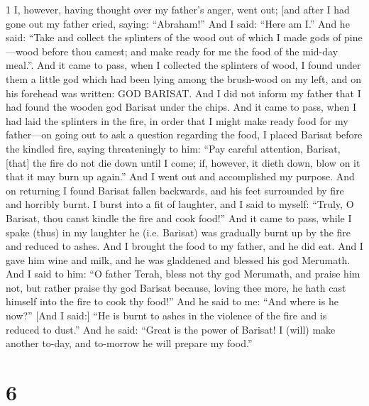 \par 1 I, however, having thought over my father's anger, went out; [and after I had gone out my father cried, saying: “Abraham!” And I said: “Here am I.” And he said: “Take and collect the splinters of the wood out of which I made gods of pine—wood before thou camest; and make ready for me the food of the mid-day meal.”. And it came to pass, when I collected the splinters of wood, I found under them a little god which had been lying among the brush-wood on my left, and on his forehead was written: GOD BARISAT. And I did not inform my father that I had found the wooden god Barisat under the chips. And it came to pass, when I had laid the splinters in the fire, in order that I might make ready food for my father—on going out to ask a question regarding the food, I placed Barisat before the kindled fire, saying threateningly to him: “Pay careful attention, Barisat, [that] the fire do not die down until I come; if, however, it dieth down, blow on it that it may burn up again.” And I went out and accomplished my purpose. And on returning I found Barisat fallen backwards, and his feet surrounded by fire and horribly burnt. I burst into a fit of laughter, and I said to myself: “Truly, O Barisat, thou canst kindle the fire and cook food!” And it came to pass, while I spake (thus) in my laughter he (i.e. Barisat) was gradually burnt up by the fire and reduced to ashes. And I brought the food to my father, and he did eat. And I gave him wine and milk, and he was gladdened and blessed his god Merumath. And I said to him: “O father Terah, bless not thy god Merumath, and praise him not, but rather praise thy god Barisat because, loving thee more, he hath cast himself into the fire to cook thy food!” And he said to me: “And where is he now?” [And I said:] “He is burnt to ashes in the violence of the fire and is reduced to dust.” And he said: “Great is the power of Barisat! I (will) make another to-day, and to-morrow he will prepare my food.”

\chapter{6}

